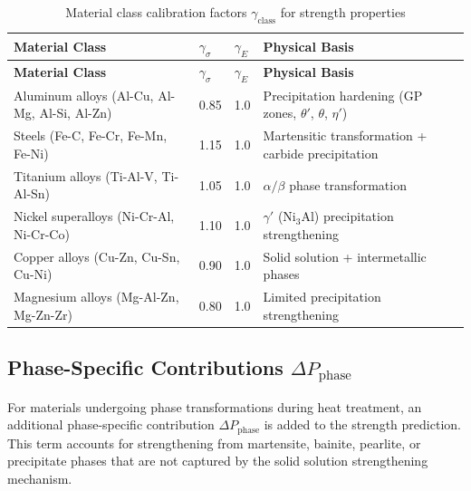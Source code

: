 \documentclass[12pt,a4paper]{article}
\begin{document}
	\begin{longtable}{p{3.5cm}p{2.5cm}p{2.5cm}p{5cm}}
		\caption{Material class calibration factors \(\gamma_{\text{class}}\) for strength properties} \label{tab:material-class-factors} \\
		\toprule
		\textbf{Material Class} & \(\gamma_{\sigma}\) & \(\gamma_{E}\) & \textbf{Physical Basis} \\
		\midrule
		\endfirsthead
		\toprule
		\textbf{Material Class} & \(\gamma_{\sigma}\) & \(\gamma_{E}\) & \textbf{Physical Basis} \\
		\midrule
		\endhead
		Aluminum alloys (Al-Cu, Al-Mg, Al-Si, Al-Zn) & 0.85 & 1.0 & Precipitation hardening (GP zones, \(\theta'\), \(\theta\), \(\eta'\)) \\
		Steels (Fe-C, Fe-Cr, Fe-Mn, Fe-Ni) & 1.15 & 1.0 & Martensitic transformation + carbide precipitation \\
		Titanium alloys (Ti-Al-V, Ti-Al-Sn) & 1.05 & 1.0 & \(\alpha/\beta\) phase transformation \\
		Nickel superalloys (Ni-Cr-Al, Ni-Cr-Co) & 1.10 & 1.0 & \(\gamma'\) (Ni\(_3\)Al) precipitation strengthening \\
		Copper alloys (Cu-Zn, Cu-Sn, Cu-Ni) & 0.90 & 1.0 & Solid solution + intermetallic phases \\
		Magnesium alloys (Mg-Al-Zn, Mg-Zn-Zr) & 0.80 & 1.0 & Limited precipitation strengthening \\
		\bottomrule
	\end{longtable}
	
	\subsection{Phase-Specific Contributions \(\Delta P_{\text{phase}}\)}
	\label{subsec:phase-contributions}
	
	For materials undergoing phase transformations during heat treatment, an additional phase-specific contribution \(\Delta P_{\text{phase}}\) is added to the strength prediction. This term accounts for strengthening from martensite, bainite, pearlite, or precipitate phases that are not captured by the solid solution strengthening mechanism.
	
\end{document}
